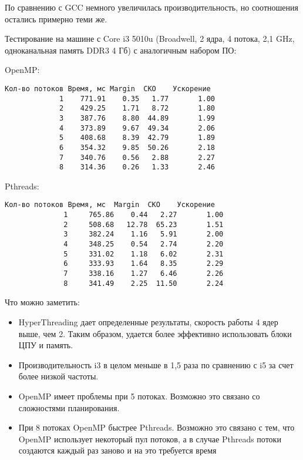 По сравнению с GCC немного увеличилась производительность, но соотношения остались примерно теми же.

Тестирование на машине с Core i3 5010u (Broadwell, 2 ядра, 4 потока, 2,1 GHz, одноканальная память DDR3 4 Гб) с аналогичным набором ПО:

\begin{figure}[H]
	\centering
	\caption{}
\end{figure}

\begin{figure}[H]
	\centering
	\caption{}
\end{figure}

\begin{figure}[H]
	\centering
	\caption{}
\end{figure}

OpenMP:
\begin{verbatim}
Кол-во потоков Время, мс Margin  СКО    Ускорение  
             1    771.91    0.35   1.77       1.00
             2    429.25    1.71   8.72       1.80
             3    387.76    8.80  44.89       1.99
             4    373.89    9.67  49.34       2.06
             5    408.68    8.39  42.79       1.89
             6    354.32    9.85  50.26       2.18
             7    340.76    0.56   2.88       2.27
             8    314.36    0.26   1.33       2.46
\end{verbatim}

Pthreads:
\begin{verbatim}
Кол-во потоков Время, мс  Margin  СКО    Ускорение  
              1     765.86    0.44   2.27       1.00
              2     508.68   12.78  65.23       1.51
              3     382.24    1.16   5.91       2.00
              4     348.25    0.54   2.74       2.20
              5     331.02    1.18   6.02       2.31
              6     333.93    1.64   8.35       2.29
              7     338.16    1.27   6.46       2.26
              8     341.49    2.25  11.50       2.24
\end{verbatim}

Что можно заметить:
\begin{itemize}
	\item HyperThreading дает определенные результаты, скорость работы 4 ядер выше, чем 2. Таким образом, удается более эффективно использовать блоки ЦПУ и память.
	\item Производительность i3 в целом меньше в 1,5 раза по сравнению с i5 за счет более низкой частоты.
	\item OpenMP имеет проблемы при 5 потоках. Возможно это связано со сложностями планирования.
	\item При 8 потоках OpenMP быстрее Pthreads. Возможно это связано с тем, что OpenMP использует некоторый пул потоков, а в случае Pthreads потоки создаются каждый раз заново и на это требуется время
\end{itemize}

